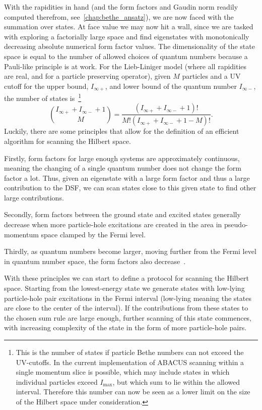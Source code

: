 \documentclass[11pt, a4paper]{report} %
\begin{document}
With the rapidities in hand (and the form factors and Gaudin norm readily computed therefrom, see~\cref{chap:bethe_ansatz}), we are now faced with the summation over states.
At face value we may now hit a wall, since we are tasked with exploring a factorially large space and find eigenstates with monotonically decreasing absolute numerical form factor values.
The dimensionality of the state space is equal to the number of allowed choices of quantum numbers because a Pauli-like principle is at work.
For the Lieb-Liniger model (where all rapidities are real, and for a particle preserving operator), given $M$ particles and a UV cutoff for the upper bound, $I_{\infty+}$, and lower bound of the quantum number $I_{\infty-}$, the number of states is~\cite{Caux2009}\footnote{This is the number of states if particle Bethe numbers can not exceed the UV-cutoffs. In the current implementation of ABACUS scanning within a single momentum slice is possible, which may include states in which individual particles exceed \(I_{\max}\), but which sum to lie within the allowed interval. Therefore this number can now be seen as a lower limit on the size of the Hilbert space under consideration.}
\begin{equation}
  \binom{I_{\infty+} + I_{\infty-} + 1}{M} = \frac{(I_{\infty+} + I_{\infty-} + 1)!}{M!(I_{\infty+} + I_{\infty-} + 1 - M)!}.
\end{equation}
Luckily, there are some principles that allow for the definition of an efficient algorithm for scanning the Hilbert space.

Firstly, form factors for large enough systems are approximately continuous, meaning the changing of a single quantum number does not change the form factor a lot.
Thus, given an eigenstate with a large form factor and thus a large contribution to the DSF, we can scan states close to this given state to find other large contributions.

Secondly, form factors between the ground state and excited states generally decrease when more particle-hole excitations are created in the area in pseudo-momentum space clamped by the Fermi level.

Thirdly, as quantum numbers become larger, moving further from the Fermi level in quantum number space, the form factors also decrease~\cite{Caux2009}.

With these principles we can start to define a protocol for scanning the Hilbert space.
Starting from the lowest-energy state we generate states with low-lying particle-hole pair excitations in the Fermi interval (low-lying meaning the states are close to the center of the interval).
If the contributions from these states to the chosen sum rule are large enough, further scanning of this state commences, with increasing complexity of the state in the form of more particle-hole pairs.
\end{document}
